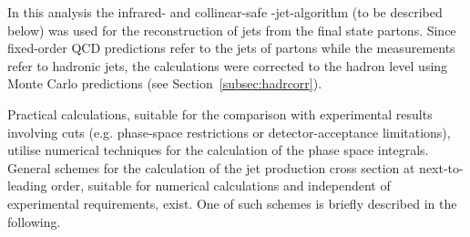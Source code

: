 In this analysis the infrared- and collinear-safe \kt-jet-algorithm (to be described below) was used for the reconstruction of jets from the final state partons. Since fixed-order QCD predictions refer to the jets of partons while the measurements refer to hadronic jets, the calculations were corrected to the hadron level using Monte Carlo predictions (see Section~\ref{subsec:hadrcorr}).

Practical calculations, suitable for the comparison with experimental results involving cuts (e.g. phase-space restrictions or detector-acceptance limitations), utilise numerical techniques for the calculation of the phase space integrals. General schemes for the calculation of the jet production cross section at next-to-leading order, suitable for numerical calculations and independent of experimental requirements, exist. One of such schemes is briefly described in the following. 